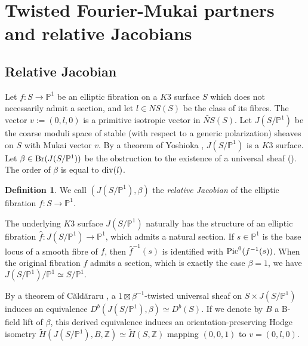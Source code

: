 \documentclass{article}
\theoremstyle{plain}
\theoremstyle{definition}
\newtheorem{definition}[theorem]{Definition}
\theoremstyle{remark}
\newcommand{\Z}{{\mathbb Z}}
\newcommand{\proj}{{\mathbb P}}
\begin{document}
\section{Twisted Fourier-Mukai partners and relative Jacobians}\label{sec4}



\subsection{Relative Jacobian}\label{sec4.1}


Let $f : S \to {\proj}^{1}$ 
be an elliptic fibration on a $K3$ surface $S$ 
which does not necessarily admit a section, 
and let $l \in NS(S)$ be the class of its fibres. 
The vector  
$v := (0, l, 0)$  
is a primitive isotropic vector in $\widetilde{NS}(S)$. 
Let 
$J(S/{\proj}^{1})$ 
be the coarse moduli space of stable (with respect to a generic polarization) sheaves on $S$ 
with Mukai vector $v$. 
By a theorem of Yoshioka \cite{Yo}, 
$J(S/{\proj}^{1})$ 
is a $K3$ surface. 
Let $\beta \in {\rm Br\/}(J(S/{\proj}^{1}))$ 
be the obstruction to the existence of a universal sheaf (\cite{Ca2}).   
The order of $\beta $ is equal to ${\rm div\/}(l)$. 


\begin{definition}\label{def of relative Jacobian}
We call  $(J(S/{\proj}^{1}), \beta )$ 
the {\it relative Jacobian\/} of the elliptic fibration 
$f : S \to {\proj}^{1}$. 
\end{definition}  




The underlying $K3$ surface 
$J(S/{\proj}^{1})$ naturally has the structure of an elliptic fibration 
$\widehat{f} : J(S/{\proj}^{1}) \to {\proj}^{1}$,  
which admits a natural section.  
If $s \in {\proj}^{1}$ is the base locus of a smooth fibre of $f$, 
then 
$\widehat{f}^{-1}(s)$ is identified with ${\rm Pic\/}^{0}(f^{-1}(s))$.  
When the original fibration $f$ admits a section,  
which is exactly the case $\beta =1$,  
we have 
$J(S/{\proj}^{1})/{\proj}^{1} \simeq S/{\proj}^{1}$.   




By a theorem of C\u ald\u araru \cite{Ca2}, 
a $1\boxtimes \beta ^{-1}$-twisted universal sheaf on 
$S \times J(S/{\proj}^{1})$  induces an equivalence 
$D^{b}(J(S/{\proj}^{1}), \beta ) \simeq D^{b}(S)$.  
If we denote by $B$ a B-field lift of $\beta $, 
this derived equivalence induces an orientation-preserving Hodge isometry 
$\widetilde{H}(J(S/{\proj}^{1}), B, {\Z}) \simeq \widetilde{H}(S, {\Z})$ 
mapping $(0, 0, 1)$ to $v=(0, l, 0)$.  
  
\end{document}

